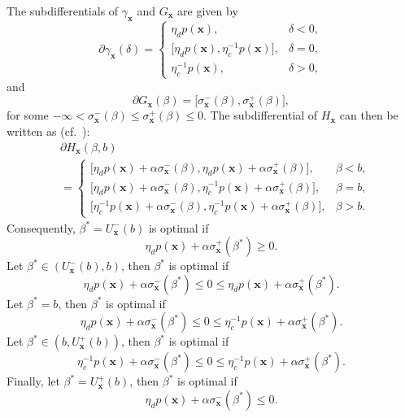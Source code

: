 \documentclass[journal]{IEEEtran}
\newcommand{\bfx}{\boldsymbol x}
\newcommand{\sright}{\sigma_{\bfx}^+}
\newcommand{\sleft}{\sigma_{\bfx}^-}
\newcommand{\Uright}{U_{\bfx}^+(b)}
\newcommand{\Uleft}{U_{\bfx}^-(b)}
\newcommand\1{\mathbf{1}}
\begin{document}
\begin{IEEEproof}
The subdifferentials of $\gamma_{\bfx}$ and $G_{\bfx}$ are given by
\begin{equation*}
\partial \gamma_{\bfx}(\delta) = \left\{
\begin{array}{ll}
\eta_d p(\bfx), & \delta < 0,\\
\lbrack\eta_d p(\bfx),\eta_c^{-1} p(\bfx)\rbrack, & \delta = 0,\\
\eta_c^{-1} p(\bfx), & \delta > 0,
\end{array}\right.
\end{equation*}
and
\begin{equation*}
\partial G_{\bfx}(\beta) = \lbrack\sleft(\beta),\sright(\beta)\rbrack,
\end{equation*}
for some $-\infty < \sleft(\beta) \le \sright(\beta) \le 0$. The subdifferential of $H_{\bfx}$ can then be written as (cf.~\cite[Theorem 23.8]{Rockafellar72}):
\begin{align*}
&\partial H_{\bfx}(\beta,b)\\
&= \left\{
\begin{array}{ll}
\lbrack\eta_d p(\bfx) + \alpha \sleft(\beta),\eta_d p(\bfx) + \alpha \sright(\beta)\rbrack, & \beta < b,\\
\lbrack\eta_d p(\bfx) + \alpha \sleft(\beta),\eta_c^{-1} p(\bfx) + \alpha \sright(\beta)\rbrack, & \beta = b,\\
\lbrack\eta_c^{-1} p(\bfx) + \alpha \sleft(\beta),\eta_c^{-1} p(\bfx) + \alpha \sright(\beta)\rbrack, & \beta > b.
\end{array}\right.
\end{align*}
Consequently, $\beta^* = \Uleft$ is optimal if
\begin{equation*}
\eta_d p(\bfx) + \alpha \sright(\beta^*) \ge 0.
\end{equation*}
Let $\beta^* \in (\Uleft,b)$, then $\beta^*$ is optimal if
\begin{equation*}
\eta_d p(\bfx) + \alpha \sleft(\beta^*) \le 0 \le \eta_d p(\bfx) + \alpha \sright(\beta^*).
\end{equation*}
Let $\beta^*  = b$, then $\beta^*$ is optimal if
\begin{equation*}
\eta_d p(\bfx) + \alpha \sleft(\beta^*) \le 0 \le \eta_c^{-1} p(\bfx) + \alpha \sright(\beta^*).
\end{equation*}
Let $\beta^* \in (b,\Uright)$, then $\beta^*$ is optimal if
\begin{equation*}
\eta_c^{-1} p(\bfx) + \alpha \sleft(\beta^*) \le 0 \le \eta_c^{-1} p(\bfx) + \alpha \sright(\beta^*).
\end{equation*}
Finally, let $\beta^*  = \Uright$, then $\beta^*$ is optimal if
\begin{equation*}
\eta_d p(\bfx) + \alpha \sleft(\beta^*) \le 0.
\end{equation*}


\end{IEEEproof}
\end{document}
